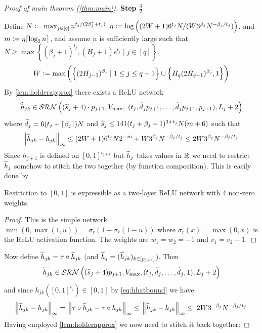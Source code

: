\begin{proof}[Proof of main theorem (\ref{thm:main})]
  \textbf{Step $\frac{3}{2}$}

  Define 
  $N \vcentcolon= \max_{j \in [q]} n^{t_j/(2 \beta^*_j + t_j)}$
  $\eta \vcentcolon= \log \left((2W + 1) 6^{t_j} N
  / (W 3^{\beta_j} N^{-\beta_j/t_j}) \right)$,
  and $m \vcentcolon= \eta \lceil\log_2 n\rceil$,
  and assume $n$ is sufficiently large such that
  $N \geq \max \left\{ (\beta_j + 1)^{t_j},
  (H_j+1)e^{t_j} \mid j \in [q] \right\}$.
  \begin{equation}
    W \vcentcolon= \max \left( \left\{ (2 H_{j-1})^{\beta_j}
      \mid 1\leq j\leq q-1 \right\}
    \cup \left\{ H_q(2H_{q-1})^{\beta_q}, 1\right\} \right)
  \end{equation}
  By \cref{lem:holderapprox} there exists a ReLU network
  \begin{equation}
    \widehat{h}_{jk} \in \mathcal{SRN} \left( (\widetilde{s}_j + 4) \cdot p_{j+1}, V_{\max}, \;
    ( t_j, \widetilde{d}_j p_{j+1}, \dots,
  \widetilde{d}_j p_{j+1}, p_{j+1}), L_j + 2 \right)
  \end{equation}
  where $\widetilde{d}_j = 6(t_j + \lceil\beta_j\rceil)N$ and
  $\widetilde{s}_j \leq 141 (t_j + \beta_j + 1)^{3 + t_j} N (m + 6)$
  such that
  \begin{equation}
    \norm{\widehat{h}_{jk} - h_{jk}}_\infty \leq (2 W + 1) 6^{t_j} N 2^{-m}
    + W 3^{\beta_j} N^{-\beta_j/t_j} \leq 2 W 3^{\beta_j} N^{-\beta_j/t_j}
    \label{eq:hhatbound}
  \end{equation} 
  Since $h_{j+1}$ is defined on $[0, 1]^{t_{j+1}}$ but $\widetilde{h}_j$ takes values
  in $\mathbb{R}$ we need to restrict $\widetilde{h}_j$ somehow to stitch
  the two together (by function composition). This is easily done by
  \begin{lem}
    Restriction to $[0, 1]$ is expressible as a two-layer ReLU network
    with 4 non-zero weights.
  \end{lem}
  \begin{proof}
    This is the simple network
    $\min(0,\max(1, u)) = \sigma_r(1 - \sigma_r(1 - u))$
    where $\sigma_r(x) = \max(0,x)$ is the ReLU activation function.
    The weights are $w_1 = w_2 = -1$ and $v_1 = v_2 - 1$.
  \end{proof}
  Now define
  $\widetilde{h}_{jk} = \tau \circ \widehat{h}_{jk}$
  (and $\widetilde{h}_{j} = (\widetilde{h}_{jk})_{k \in [p_{j + 1}]}$).
  Then
  \begin{equation}
    \widetilde{h}_{jk} \in \mathcal{SRN}\left( (\widetilde{s}_j + 4) p_{j+1},
    V_{\max}, (t_j, \widetilde{d}_j, \dots, \widetilde{d}_j, 1), L_j + 2 \right)
  \end{equation}
  and since $h_{jk}([0, 1]^{t_j}) \in [0, 1]$ by \cref{eq:hhatbound} we have
  \begin{align}
    \norm{\widetilde{h}_{jk} - h_{jk}}_\infty
    = \; \norm{\tau \circ \widehat{h}_{jk} - \tau \circ h_{jk}}_\infty
     \leq \; \norm{\widehat{h}_{jk} - h_{jk}}_\infty
     \leq \; 2 W 3^{-\beta_j} N^{-\beta_j/t_j}
  \end{align}
  Having employed \cref{lem:holderapprox}
  we now need to stitch it
  back together:


\end{proof}
